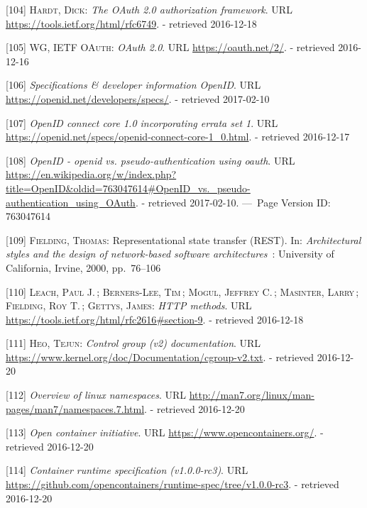 \documentclass[12pt,english,a4paper,titlepage,cleardoublepage=empty,dottedtoc]{report}
\begin{document}
\hypertarget{ref-web_spec_oauth-2}{}
{[}104{]} \textsc{Hardt, Dick}: \emph{The OAuth 2.0 authorization
framework}. URL \url{https://tools.ietf.org/html/rfc6749}. - retrieved
2016-12-18

\hypertarget{ref-web_2016_oauth-2}{}
{[}105{]} \textsc{WG, IETF OAuth}: \emph{OAuth 2.0}. URL
\url{https://oauth.net/2/}. - retrieved 2016-12-16

\hypertarget{ref-web_spec_openid-spec-index}{}
{[}106{]} \emph{Specifications \& developer information OpenID}. URL
\url{https://openid.net/developers/specs/}. - retrieved 2017-02-10

\hypertarget{ref-web_spec_openid-connect-1}{}
{[}107{]} \emph{OpenID connect core 1.0 incorporating errata set 1}. URL
\url{https://openid.net/specs/openid-connect-core-1_0.html}. - retrieved
2016-12-17

\hypertarget{ref-web_2017_wikipedia_openid-vs-pseudo-oauth}{}
{[}108{]} \emph{OpenID - openid vs. pseudo-authentication using oauth}.
URL
\url{https://en.wikipedia.org/w/index.php?title=OpenID\&oldid=763047614\#OpenID_vs._pseudo-authentication_using_OAuth}.
- retrieved 2017-02-10. ---~Page Version ID: 763047614

\hypertarget{ref-web_spec_rest}{}
{[}109{]} \textsc{Fielding, Thomas}: Representational state transfer
(REST). In: \emph{Architectural styles and the design of network-based
software architectures}~: University of California, Irvine, 2000,
pp.~76--106

\hypertarget{ref-web_spec_http-methods}{}
{[}110{]} \textsc{Leach, Paul J.}\,; \textsc{Berners-Lee, Tim}\,;
\textsc{Mogul, Jeffrey C.}\,; \textsc{Masinter, Larry}\,;
\textsc{Fielding, Roy T.}\,; \textsc{Gettys, James}: \emph{HTTP
methods}. URL \url{https://tools.ietf.org/html/rfc2616\#section-9}. -
retrieved 2016-12-18

\hypertarget{ref-web_2015_cgroup-doc}{}
{[}111{]} \textsc{Heo, Tejun}: \emph{Control group (v2) documentation}.
URL \url{https://www.kernel.org/doc/Documentation/cgroup-v2.txt}. -
retrieved 2016-12-20

\hypertarget{ref-web_2016_kernel-namespace}{}
{[}112{]} \emph{Overview of linux namespaces}. URL
\url{http://man7.org/linux/man-pages/man7/namespaces.7.html}. -
retrieved 2016-12-20

\hypertarget{ref-web_2016_open-container-initiative}{}
{[}113{]} \emph{Open container initiative}. URL
\url{https://www.opencontainers.org/}. - retrieved 2016-12-20

\hypertarget{ref-web_oci-spec_runtime}{}
{[}114{]} \emph{Container runtime specification (v1.0.0-rc3)}. URL
\url{https://github.com/opencontainers/runtime-spec/tree/v1.0.0-rc3}. -
retrieved 2016-12-20
\end{document}
